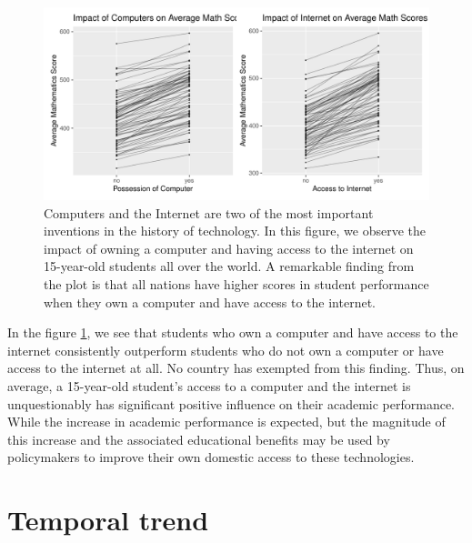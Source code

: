 \begin{Schunk}
\begin{figure}[H]
\includegraphics[width=1\linewidth]{learningtower_files/figure-latex/compint-plot-1} \caption[Computers and the Internet are two of the most important inventions in the history of technology]{Computers and the Internet are two of the most important inventions in the history of technology. In this figure, we observe the impact of owning a computer and having access to the internet on 15-year-old students all over the world. A remarkable finding from the plot is that all nations have higher scores in student performance when they own a computer and have access to the internet.}\label{fig:compint-plot}
\end{figure}
\end{Schunk}

In the figure \ref{fig:compint-plot}, we see that students who own a
computer and have access to the internet consistently outperform
students who do not own a computer or have access to the internet at
all. No country has exempted from this finding. Thus, on average, a
15-year-old student's access to a computer and the internet is
unquestionably has significant positive influence on their academic
performance. While the increase in academic performance is expected, but
the magnitude of this increase and the associated educational benefits
may be used by policymakers to improve their own domestic access to
these technologies.

\hypertarget{temporal-trend}{%
\section{Temporal trend}\label{temporal-trend}}

